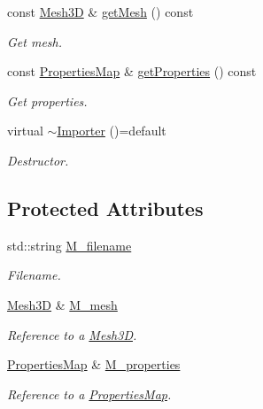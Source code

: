 \begin{DoxyCompactItemize}
const \hyperlink{classFVCode3D_1_1Mesh3D}{Mesh3D} \& \hyperlink{classFVCode3D_1_1Importer_a90c9c94819bf2d1c06f49b5bc5ffe11e}{get\+Mesh} () const 
\begin{DoxyCompactList}\small\item\em Get mesh. \end{DoxyCompactList}\item 
const \hyperlink{classFVCode3D_1_1PropertiesMap}{Properties\+Map} \& \hyperlink{classFVCode3D_1_1Importer_a2011b0eb20ffe3e5aa72be557552f5dc}{get\+Properties} () const 
\begin{DoxyCompactList}\small\item\em Get properties. \end{DoxyCompactList}\item 
virtual \hyperlink{classFVCode3D_1_1Importer_a724094106bd5561c6e741d30e3ad44b7}{$\sim$\+Importer} ()=default
\begin{DoxyCompactList}\small\item\em Destructor. \end{DoxyCompactList}\end{DoxyCompactItemize}
\subsection*{Protected Attributes}
\begin{DoxyCompactItemize}
\item 
std\+::string \hyperlink{classFVCode3D_1_1Importer_a318e689fb93c5c906f85aa13685724d7}{M\+\_\+filename}
\begin{DoxyCompactList}\small\item\em Filename. \end{DoxyCompactList}\item 
\hyperlink{classFVCode3D_1_1Mesh3D}{Mesh3D} \& \hyperlink{classFVCode3D_1_1Importer_a6f1542d6c6ac192e36c8eec7dc366653}{M\+\_\+mesh}
\begin{DoxyCompactList}\small\item\em Reference to a \hyperlink{classFVCode3D_1_1Mesh3D}{Mesh3D}. \end{DoxyCompactList}\item 
\hyperlink{classFVCode3D_1_1PropertiesMap}{Properties\+Map} \& \hyperlink{classFVCode3D_1_1Importer_af678e18e971d5a132f5ba494981f6dae}{M\+\_\+properties}
\begin{DoxyCompactList}\small\item\em Reference to a \hyperlink{classFVCode3D_1_1PropertiesMap}{Properties\+Map}. \end{DoxyCompactList}\end{DoxyCompactItemize}
